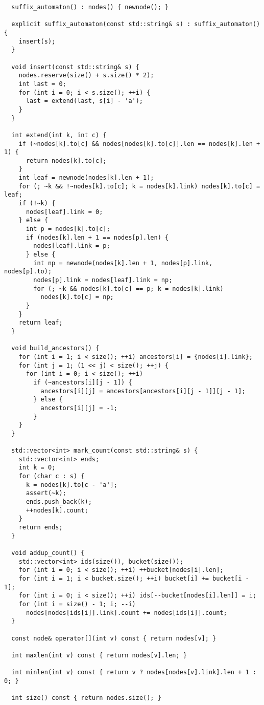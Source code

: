 \documentclass[6pt]{article}
\begin{document}
\begin{multicols}{2}
\begin{lstlisting}
  suffix_automaton() : nodes() { newnode(); }

  explicit suffix_automaton(const std::string& s) : suffix_automaton() {
    insert(s);
  }

  void insert(const std::string& s) {
    nodes.reserve(size() + s.size() * 2);
    int last = 0;
    for (int i = 0; i < s.size(); ++i) {
      last = extend(last, s[i] - 'a');
    }
  }

  int extend(int k, int c) {
    if (~nodes[k].to[c] && nodes[nodes[k].to[c]].len == nodes[k].len + 1) {
      return nodes[k].to[c];
    }
    int leaf = newnode(nodes[k].len + 1);
    for (; ~k && !~nodes[k].to[c]; k = nodes[k].link) nodes[k].to[c] = leaf;
    if (!~k) {
      nodes[leaf].link = 0;
    } else {
      int p = nodes[k].to[c];
      if (nodes[k].len + 1 == nodes[p].len) {
        nodes[leaf].link = p;
      } else {
        int np = newnode(nodes[k].len + 1, nodes[p].link, nodes[p].to);
        nodes[p].link = nodes[leaf].link = np;
        for (; ~k && nodes[k].to[c] == p; k = nodes[k].link)
          nodes[k].to[c] = np;
      }
    }
    return leaf;
  }

  void build_ancestors() {
    for (int i = 1; i < size(); ++i) ancestors[i] = {nodes[i].link};
    for (int j = 1; (1 << j) < size(); ++j) {
      for (int i = 0; i < size(); ++i)
        if (~ancestors[i][j - 1]) {
          ancestors[i][j] = ancestors[ancestors[i][j - 1]][j - 1];
        } else {
          ancestors[i][j] = -1;
        }
    }
  }

  std::vector<int> mark_count(const std::string& s) {
    std::vector<int> ends;
    int k = 0;
    for (char c : s) {
      k = nodes[k].to[c - 'a'];
      assert(~k);
      ends.push_back(k);
      ++nodes[k].count;
    }
    return ends;
  }

  void addup_count() {
    std::vector<int> ids(size()), bucket(size());
    for (int i = 0; i < size(); ++i) ++bucket[nodes[i].len];
    for (int i = 1; i < bucket.size(); ++i) bucket[i] += bucket[i - 1];
    for (int i = 0; i < size(); ++i) ids[--bucket[nodes[i].len]] = i;
    for (int i = size() - 1; i; --i)
      nodes[nodes[ids[i]].link].count += nodes[ids[i]].count;
  }

  const node& operator[](int v) const { return nodes[v]; }

  int maxlen(int v) const { return nodes[v].len; }

  int minlen(int v) const { return v ? nodes[nodes[v].link].len + 1 : 0; }

  int size() const { return nodes.size(); }


\end{lstlisting}
\end{multicols}
\end{document}
